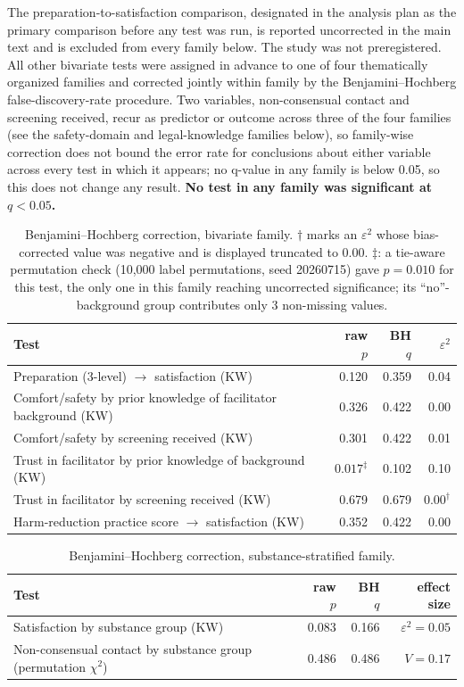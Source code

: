 \documentclass[12pt]{article}
\begin{document}
The preparation-to-satisfaction comparison, designated in the analysis plan as the primary comparison
before any test was run, is reported uncorrected in the main text and is excluded from every family below.
The study was not preregistered. All other bivariate tests were assigned in advance to one of four
thematically organized families and corrected jointly within family by the Benjamini--Hochberg
false-discovery-rate procedure. Two variables, non-consensual contact and screening received, recur as
predictor or outcome across three of the four families (see the safety-domain and legal-knowledge families
below), so family-wise correction does not bound the error rate for conclusions about either variable across
every test in which it appears; no q-value in any family is below 0.05, so this does not change any result.
\textbf{No test in any family was significant at $q<0.05$.}

\begin{table}[htbp]
\centering
\caption{Benjamini--Hochberg correction, bivariate family. $\dagger$ marks an $\varepsilon^2$ whose
bias-corrected value was negative and is displayed truncated to 0.00. $\ddagger$: a tie-aware permutation
check (10,000 label permutations, seed 20260715) gave $p=0.010$ for this test, the only one in this family
reaching uncorrected significance; its ``no''-background group contributes only 3 non-missing values.}
\begin{tabular}{lrrr}
\toprule
Test & raw $p$ & BH $q$ & $\varepsilon^2$ \\
\midrule
Preparation (3-level) $\rightarrow$ satisfaction (KW) & 0.120 & 0.359 & 0.04 \\
Comfort/safety by prior knowledge of facilitator background (KW) & 0.326 & 0.422 & 0.00 \\
Comfort/safety by screening received (KW) & 0.301 & 0.422 & 0.01 \\
Trust in facilitator by prior knowledge of background (KW) & $0.017^{\ddagger}$ & 0.102 & 0.10 \\
Trust in facilitator by screening received (KW) & 0.679 & 0.679 & $0.00^{\dagger}$ \\
Harm-reduction practice score $\rightarrow$ satisfaction (KW) & 0.352 & 0.422 & 0.00 \\
\bottomrule
\end{tabular}
\end{table}

\begin{table}[htbp]
\centering
\caption{Benjamini--Hochberg correction, substance-stratified family.}
\begin{tabular}{lrrr}
\toprule
Test & raw $p$ & BH $q$ & effect size \\
\midrule
Satisfaction by substance group (KW) & 0.083 & 0.166 & $\varepsilon^2=0.05$ \\
Non-consensual contact by substance group (permutation $\chi^2$) & 0.486 & 0.486 & $V=0.17$ \\
\bottomrule
\end{tabular}
\end{table}
\end{document}
